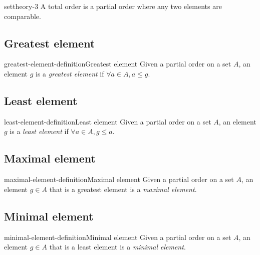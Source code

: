 \documentclass[preview]{standalone}
\begin{document}
\begin{snippet}{settheory-3}
    A total order is a partial order where any two elements are comparable.
\end{snippet}

\subsection{Greatest element}

\begin{snippetdefinition}{greatest-element-definition}{Greatest element}
    Given a partial order on a set \(A\), an element \(g\) is a \textit{greatest element}
    if \(\forall a\in A, a \leq g\).
\end{snippetdefinition}

\subsection{Least element}

\begin{snippetdefinition}{least-element-definition}{Least element}
    Given a partial order on a set \(A\), an element \(g\) is a \textit{least element}
    if \(\forall a\in A, g \leq a\).
\end{snippetdefinition}

\subsection{Maximal element}

\begin{snippetdefinition}{maximal-element-definition}{Maximal element}
    Given a partial order on a set \(A\), an element \(g\in A\) that is
    a greatest element is a \textit{maximal element}.
\end{snippetdefinition}

\subsection{Minimal element}

\begin{snippetdefinition}{minimal-element-definition}{Minimal element}
    Given a partial order on a set \(A\), an element \(g\in A\) that is
    a least element is a \textit{minimal element}.
\end{snippetdefinition}
\end{document}
